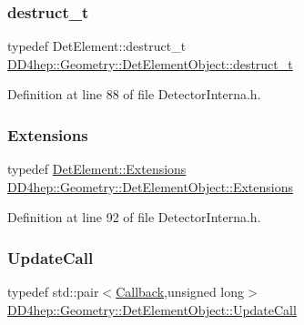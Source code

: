 \subsubsection{\texorpdfstring{destruct\+\_\+t}{destruct\_t}}
{\footnotesize\ttfamily typedef Det\+Element\+::destruct\+\_\+t \hyperlink{class_d_d4hep_1_1_geometry_1_1_det_element_object_af4773c2a725fc7076297670a7ae1ac41}{D\+D4hep\+::\+Geometry\+::\+Det\+Element\+Object\+::destruct\+\_\+t}}



Definition at line 88 of file Detector\+Interna.\+h.

\hypertarget{class_d_d4hep_1_1_geometry_1_1_det_element_object_ac74df66a49fc20d985f033a063b7dbab}{}\label{class_d_d4hep_1_1_geometry_1_1_det_element_object_ac74df66a49fc20d985f033a063b7dbab} 
\subsubsection{\texorpdfstring{Extensions}{Extensions}}
{\footnotesize\ttfamily typedef \hyperlink{class_d_d4hep_1_1_geometry_1_1_det_element_aa3651ed4a11789675607a06d2f6846ff}{Det\+Element\+::\+Extensions} \hyperlink{class_d_d4hep_1_1_geometry_1_1_det_element_object_ac74df66a49fc20d985f033a063b7dbab}{D\+D4hep\+::\+Geometry\+::\+Det\+Element\+Object\+::\+Extensions}}



Definition at line 92 of file Detector\+Interna.\+h.

\hypertarget{class_d_d4hep_1_1_geometry_1_1_det_element_object_a3b316c36c1b168152e4c96a42ca561aa}{}\label{class_d_d4hep_1_1_geometry_1_1_det_element_object_a3b316c36c1b168152e4c96a42ca561aa} 
\subsubsection{\texorpdfstring{Update\+Call}{UpdateCall}}
{\footnotesize\ttfamily typedef std\+::pair$<$\hyperlink{class_d_d4hep_1_1_callback}{Callback},unsigned long$>$ \hyperlink{class_d_d4hep_1_1_geometry_1_1_det_element_object_a3b316c36c1b168152e4c96a42ca561aa}{D\+D4hep\+::\+Geometry\+::\+Det\+Element\+Object\+::\+Update\+Call}}



